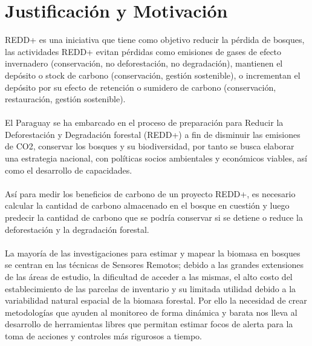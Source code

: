 \section{Justificación y Motivación}

REDD+ es una iniciativa que tiene como objetivo reducir la p\'erdida de bosques, las actividades REDD+ evitan p\'erdidas como emisiones de gases de efecto invernadero (conservaci\'on, no deforestaci\'on, no degradaci\'on), mantienen el dep\'osito o stock de carbono (conservaci\'on, gesti\'on sostenible), o incrementan el dep\'osito por su efecto de retenci\'on o sumidero de carbono (conservaci\'on, restauraci\'on, gesti\'on sostenible)\cite{peralta2013analisis}.\\~\\
El Paraguay se ha embarcado en el proceso de preparaci\'on para Reducir la Deforestaci\'on y Degradaci\'on forestal (REDD+) a fin de disminuir las emisiones de CO2, conservar los bosques y su biodiversidad, por tanto se busca elaborar una estrategia nacional, con pol\'iticas socios ambientales y econ\'omicos viables, as\'i como el desarrollo de capacidades.\\~\\
As\'i para medir los beneficios de carbono de un proyecto REDD+, es necesario calcular la cantidad de carbono almacenado en el bosque en cuesti\'on y luego predecir la cantidad de carbono que se podr\'ia conservar si se detiene o reduce la deforestaci\'on y la degradaci\'on forestal\cite{nellemann2009carbono}.\\~\\
La mayor\'ia de las investigaciones para estimar y mapear la biomasa en bosques se centran en las t\'ecnicas de Sensores Remotos; debido a las grandes extensiones de las \'areas de estudio, la dificultad de acceder a las mismas, el alto costo del establecimiento de las parcelas de inventario y su limitada utilidad debido a la variabilidad natural espacial de la biomasa forestal. Por ello la necesidad de crear metodolog\'ias que ayuden al monitoreo de forma din\'amica y barata nos lleva al desarrollo de herramientas libres que permitan estimar focos de alerta para la toma de acciones y controles m\'as rigurosos a tiempo.

